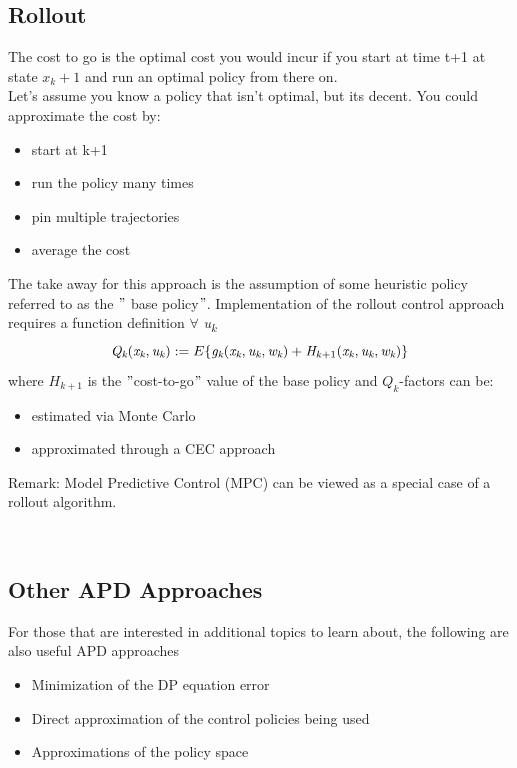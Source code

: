 \documentclass[twoside]{article}
\begin{document}
\subsection{Rollout}
The cost to go is the optimal cost you would incur if you start at time t+1 at state $x_k +1$ and run an optimal policy from there on.\\
Let's assume you know a policy that isn't optimal, but its decent.  You could approximate the cost by:
\begin{itemize}
    \item start at k+1 
    \item run the policy many times
    \item pin multiple trajectories
    \item average the cost
\end{itemize}
The take away for this approach is the assumption of some heuristic policy referred to as the $"$ base policy$"$.  Implementation of the rollout control approach requires a function definition $ \forall $ \textit{u\textsubscript{k}} $$
\textit{Q\textsubscript{k}}(\textit{x\textsubscript{k}}, \textit{u\textsubscript{k}}) := E  \{  \textit{g\textsubscript{k}}(\textit{x\textsubscript{k}}, \textit{u\textsubscript{k}}, \textit{w\textsubscript{k}}) + \textit{H\textsubscript{k}}\textsubscript{+1}(\textit{x\textsubscript{k}}, \textit{u\textsubscript{k}}, \textit{w\textsubscript{k}}) \}$$ where $H_{k+1}$ is the $"$cost-to-go$"$  value of the base policy and $Q_k$-factors can be:
\begin{itemize}
    \item estimated via Monte Carlo
    \item approximated through a CEC approach
\end{itemize}
Remark: Model Predictive Control (MPC) can be viewed as a special case of a rollout algorithm.



\\ \subsection{Other APD Approaches}
For those that are interested in additional topics to learn about, the following are also useful APD approaches
\begin{itemize}
    \item Minimization of the DP equation error
    \item Direct approximation of the control policies being used
    \item Approximations of the policy space
\end{itemize}
\end{document}

